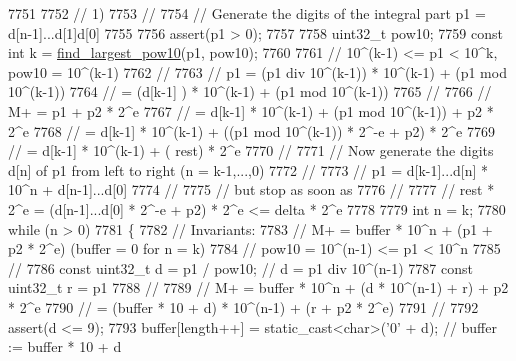 \begin{DoxyCode}
7751 
7752     \textcolor{comment}{// 1)}
7753     \textcolor{comment}{//}
7754     \textcolor{comment}{// Generate the digits of the integral part p1 = d[n-1]...d[1]d[0]}
7755 
7756     assert(p1 > 0);
7757 
7758     uint32\_t pow10;
7759     \textcolor{keyword}{const} \textcolor{keywordtype}{int} k = \hyperlink{namespacenlohmann_1_1detail_1_1dtoa__impl_a264df2b5a7e19b864859161f3501155e}{find\_largest\_pow10}(p1, pow10);
7760 
7761     \textcolor{comment}{//      10^(k-1) <= p1 < 10^k, pow10 = 10^(k-1)}
7762     \textcolor{comment}{//}
7763     \textcolor{comment}{//      p1 = (p1 div 10^(k-1)) * 10^(k-1) + (p1 mod 10^(k-1))}
7764     \textcolor{comment}{//         = (d[k-1]         ) * 10^(k-1) + (p1 mod 10^(k-1))}
7765     \textcolor{comment}{//}
7766     \textcolor{comment}{//      M+ = p1                                             + p2 * 2^e}
7767     \textcolor{comment}{//         = d[k-1] * 10^(k-1) + (p1 mod 10^(k-1))          + p2 * 2^e}
7768     \textcolor{comment}{//         = d[k-1] * 10^(k-1) + ((p1 mod 10^(k-1)) * 2^-e + p2) * 2^e}
7769     \textcolor{comment}{//         = d[k-1] * 10^(k-1) + (                         rest) * 2^e}
7770     \textcolor{comment}{//}
7771     \textcolor{comment}{// Now generate the digits d[n] of p1 from left to right (n = k-1,...,0)}
7772     \textcolor{comment}{//}
7773     \textcolor{comment}{//      p1 = d[k-1]...d[n] * 10^n + d[n-1]...d[0]}
7774     \textcolor{comment}{//}
7775     \textcolor{comment}{// but stop as soon as}
7776     \textcolor{comment}{//}
7777     \textcolor{comment}{//      rest * 2^e = (d[n-1]...d[0] * 2^-e + p2) * 2^e <= delta * 2^e}
7778 
7779     \textcolor{keywordtype}{int} n = k;
7780     \textcolor{keywordflow}{while} (n > 0)
7781     \{
7782         \textcolor{comment}{// Invariants:}
7783         \textcolor{comment}{//      M+ = buffer * 10^n + (p1 + p2 * 2^e)    (buffer = 0 for n = k)}
7784         \textcolor{comment}{//      pow10 = 10^(n-1) <= p1 < 10^n}
7785         \textcolor{comment}{//}
7786         \textcolor{keyword}{const} uint32\_t d = p1 / pow10;  \textcolor{comment}{// d = p1 div 10^(n-1)}
7787         \textcolor{keyword}{const} uint32\_t r = p1 %
7788         \textcolor{comment}{//}
7789         \textcolor{comment}{//      M+ = buffer * 10^n + (d * 10^(n-1) + r) + p2 * 2^e}
7790         \textcolor{comment}{//         = (buffer * 10 + d) * 10^(n-1) + (r + p2 * 2^e)}
7791         \textcolor{comment}{//}
7792         assert(d <= 9);
7793         buffer[length++] = \textcolor{keyword}{static\_cast<}\textcolor{keywordtype}{char}\textcolor{keyword}{>}(\textcolor{charliteral}{'0'} + d); \textcolor{comment}{// buffer := buffer * 10 + d}

\end{DoxyCode}
